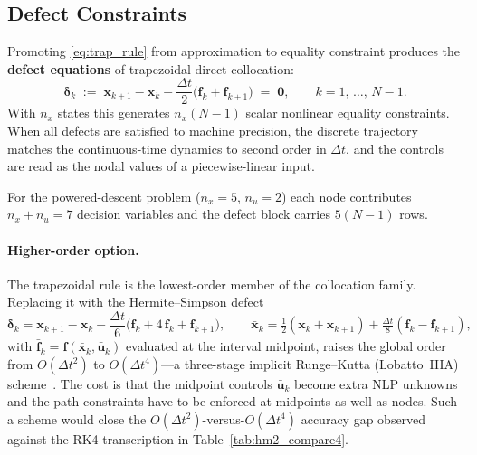\documentclass[../main.tex]{subfiles}
\begin{document}
\subsection{Defect Constraints}\label{sec:defects}

Promoting \eqref{eq:trap_rule} from approximation to equality constraint produces the \textbf{defect equations} of trapezoidal direct collocation:
\begin{equation}
    \boldsymbol{\delta}_k \;:=\; \mathbf{x}_{k+1} - \mathbf{x}_k - \frac{\Delta t}{2}\bigl(\mathbf{f}_k + \mathbf{f}_{k+1}\bigr) \;=\; \mathbf{0},
    \qquad k = 1,\, \ldots,\, N-1.
    \label{eq:defects}
\end{equation}
With $n_x$ states this generates $n_x(N-1)$ scalar nonlinear equality constraints. When all defects are satisfied to machine precision, the discrete trajectory matches the continuous-time dynamics to second order in $\Delta t$, and the controls are read as the nodal values of a piecewise-linear input.

For the powered-descent problem ($n_x = 5$, $n_u = 2$) each node contributes $n_x + n_u = 7$ decision variables and the defect block carries $5(N-1)$ rows.

\paragraph{Higher-order option.} The trapezoidal rule is the lowest-order member of the collocation family. Replacing it with the Hermite--Simpson defect
\begin{equation}
    \boldsymbol{\delta}_k = \mathbf{x}_{k+1} - \mathbf{x}_k
    - \frac{\Delta t}{6}\bigl(\mathbf{f}_k + 4\,\bar{\mathbf{f}}_{k} + \mathbf{f}_{k+1}\bigr),
    \qquad
    \bar{\mathbf{x}}_{k} = \tfrac{1}{2}(\mathbf{x}_k+\mathbf{x}_{k+1}) + \tfrac{\Delta t}{8}(\mathbf{f}_k - \mathbf{f}_{k+1}),
    \label{eq:hermite_simpson}
\end{equation}
with $\bar{\mathbf{f}}_{k} = \mathbf{f}(\bar{\mathbf{x}}_{k},\bar{\mathbf{u}}_{k})$ evaluated at the interval midpoint, raises the global order from $O(\Delta t^2)$ to $O(\Delta t^4)$---a three-stage implicit Runge--Kutta (Lobatto~IIIA) scheme~\cite[Eqs.~(4.58)--(4.60), p.~147]{betts2010}. The cost is that the midpoint controls $\bar{\mathbf{u}}_{k}$ become extra NLP unknowns and the path constraints have to be enforced at midpoints as well as nodes. Such a scheme would close the $O(\Delta t^2)$-versus-$O(\Delta t^4)$ accuracy gap observed against the RK4 transcription in Table~\ref{tab:hm2_compare4}.
\end{document}
